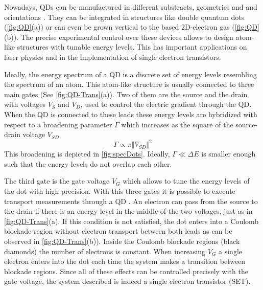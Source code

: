   Nowadays, QDs can be manufactured in different substracts, geometries and  and orientations \citep{bimberg_quantum_1999}. They can be integrated in structures like double quantum dots (\ref{fig:QD}(a)) or can even be grown vertical to the based 2D-electron gas (\ref{fig:QD}(b)). The precise experimental control over these devices allows to design atom-like structures with tunable energy levels. This has important applications on laser physics and in the implementation of single electron transistors. 


  

   Ideally, the energy spectrum of a QD is a discrete set of energy levels resembling the spectrum of an atom. This atom-like structure is usually connected to three main gates (See \ref{fig:QD-Trans}(a)). Two of them are the source and the drain with voltages $V_S$ and $V_D$, used to control the electric gradient through the QD. When the QD is connected to these leads these energy levels are hybridized with respect to a broadening parameter $\Gamma$ which increases as the square of the source-drain voltage $V_{SD}$ 
\begin{equation}
    \Gamma \propto \pi \Vert V_{SD} \Vert^2
\end{equation}
\noindent This broadening is depicted in \ref{fig:specDots}. Ideally, $\Gamma \ll \Delta E$ is smaller enough such that the energy levels do not overlap each other. 

The third gate is the gate voltage $V_G$ which allows to tune the energy levels of the dot with high  precision. With this three gates it is possible to execute transport measurements through a QD . An electron can pass from the source to the drain if there is an energy level in the middle of the two voltages, just as in \ref{fig:QD-Trans}(a). If this condition is not satisfied,  the dot enters into a Coulomb blockade region without  electron transport between both leads as can be observed in \ref{fig:QD-Trans}(b)). Inside the Coulomb blockade regions (black diamonds) the number of electrons is constant. When increasing $V_G$ a single electron enters into the dot each time the system makes a transition between blockade regions. Since all of these effects can be controlled precisely with the gate voltage, the system described is indeed a single electron transistor (SET).  

